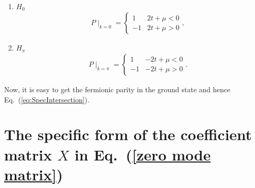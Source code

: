 \documentclass[aps, prb, showpacs, twocolumn, %
amssymb,superscriptaddress]{revtex4}
\begin{document}
\begin{enumerate}
\item $H_0$
\begin{eqnarray}
P\mid_{k=0}= \begin{cases} 1 & 2t+\mu<0 \\ -1 & 2t+\mu>0\end{cases},
\end{eqnarray}
\item $H_{\pi}$
\begin{eqnarray}
P\mid_{k=\pi}= \begin{cases} 1 & -2t+\mu<0 \\ -1 & -2t+\mu>0\end{cases}.
\end{eqnarray}
\end{enumerate}
Now, it is easy to get the fermionic parity in the ground state and hence Eq.~(\ref{eq:SpecIntersection}).


\section{The specific form of the coefficient matrix $X$ in Eq.~(\ref{zero mode matrix})}
\label{sec:zero mode matrix}
\end{document}
